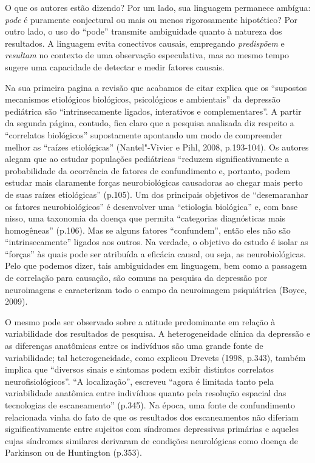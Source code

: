 O que os autores estão dizendo? Por um lado, sua linguagem permanece
ambígua: \emph{pode} é puramente conjectural ou mais ou menos
rigorosamente hipotético? Por outro lado, o uso do ``pode'' transmite
ambiguidade quanto à natureza dos resultados. A linguagem evita
conectivos causais, empregando \emph{predispõem} e \emph{resultam} no
contexto de uma observação especulativa, mas ao mesmo tempo sugere uma
capacidade de detectar e medir fatores causais.

Na sua primeira pagina a revisão que acabamos de citar explica que os
``supostos mecanismos etiológicos biológicos, psicológicos e
ambientais'' da depressão pediátrica são ``intrinsecamente ligados,
interativos e complementares''. A partir da segunda página, contudo,
fica claro que a pesquisa analisada diz respeito a ``correlatos
biológicos'' supostamente apontando um modo de compreender melhor as
``raízes etiológicas'' (Nantel"-Vivier e Pihl, 2008, p.193-104). Os
autores alegam que ao estudar populações pediátricas ``reduzem
significativamente a probabilidade da ocorrência de fatores de
confundimento e, portanto, podem estudar mais claramente forças
neurobiológicas causadoras ao chegar mais perto de suas raízes
etiológicas'' (p.105). Um dos principais objetivos de ``desemaranhar os
fatores neurobiológicos'' é desenvolver uma ``etiologia biológica'' e,
com base nisso, uma taxonomia da doença que permita ``categorias
diagnósticas mais homogêneas'' (p.106). Mas se alguns fatores
``confundem'', então eles não são ``intrinsecamente'' ligados aos
outros. Na verdade, o objetivo do estudo é isolar as ``forças'' às quais
pode ser atribuída a eficácia causal, ou seja, as neurobiológicas. Pelo
que podemos dizer, tais ambiguidades em linguagem, bem como a passagem
de correlação para causação, são comuns na pesquisa da depressão por
neuroimagens e caracterizam todo o campo da neuroimagem psiquiátrica
(Boyce, 2009).

O mesmo pode ser observado sobre a atitude predominante em relação à
variabilidade dos resultados de pesquisa. A heterogeneidade clínica da
depressão e as diferenças anatômicas entre os indivíduos são uma grande
fonte de variabilidade; tal heterogeneidade, como explicou Drevets
(1998, p.343), também implica que ``diversos sinais e sintomas podem
exibir distintos correlatos neurofisiológicos''. ``A localização'',
escreveu ``agora é limitada tanto pela variabilidade anatômica entre
indivíduos quanto pela resolução espacial das tecnologias de
escaneamento'' (p.345). Na época, uma fonte de confundimento relacionada
vinha do fato de que os resultados dos escaneamentos não diferiam
significativamente entre sujeitos com síndromes depressivas primárias e
aqueles cujas síndromes similares derivaram de condições neurológicas
como doença de Parkinson ou de Huntington (p.353).

